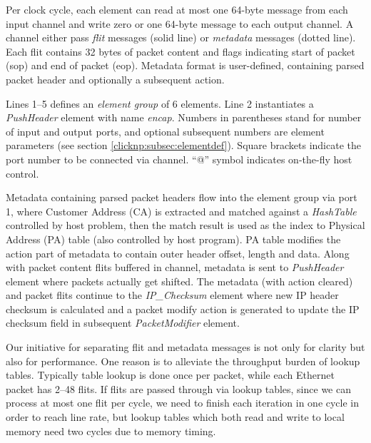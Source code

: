 Per clock cycle, each element can read at most one 64-byte message from each input channel and write zero or one 64-byte message to each output channel. A channel either pass \textit{flit} messages (solid line) or \textit{metadata} messages (dotted line). Each flit contains 32 bytes of packet content and flags indicating start of packet (sop) and end of packet (eop). Metadata format is user-defined, containing parsed packet header and optionally a subsequent action.

Lines 1--5 defines an \textit{element group} of 6 elements. Line 2 instantiates a \textit{PushHeader} element with name \textit{encap}. Numbers in parentheses stand for number of input and output ports, and optional subsequent numbers are element parameters (see section \ref{clicknp:subsec:elementdef}). Square brackets indicate the port number to be connected via channel. ``@'' symbol indicates on-the-fly host control.

Metadata containing parsed packet headers flow into the element group via port 1, where Customer Address (CA) is extracted and matched against a \textit{HashTable} controlled by host problem, then the match result is used as the index to Physical Address (PA) table (also controlled by host program). PA table modifies the action part of metadata to contain outer header offset, length and data. Along with packet content flits buffered in channel, metadata is sent to \textit{PushHeader} element where packets actually get shifted. The metadata (with action cleared) and packet flits continue to the \textit{IP\_Checksum} element where new IP header checksum is calculated and a packet modify action is generated to update the IP checksum field in subsequent \textit{PacketModifier} element.

Our initiative for separating flit and metadata messages is not only for clarity but also for performance. One reason is to alleviate the throughput burden of lookup tables. Typically table lookup is done once per packet, while each Ethernet packet has 2--48 flits. If flits are passed through via lookup tables, since we can process at most one flit per cycle, we need to finish each iteration in one cycle in order to reach line rate, but lookup tables which both read and write to local memory need two cycles due to memory timing.

